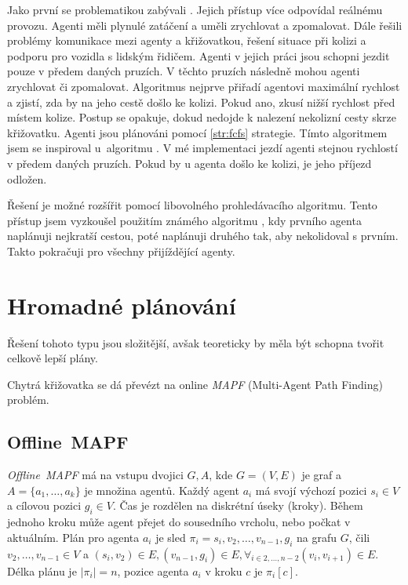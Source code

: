 Jako první se problematikou zabývali \citet*{Dresner}.
Jejich přístup více odpovídal reálnému provozu.
Agenti měli plynulé zatáčení a uměli zrychlovat a zpomalovat.
Dále \citet{Dresner} řešili problémy komunikace mezi agenty a křižovatkou, řešení situace při kolizi a podporu pro vozidla s lidským řidičem.
Agenti v jejich práci jsou schopni jezdit pouze v předem daných pruzích.
V těchto pruzích následně mohou agenti zrychlovat či zpomalovat.
Algoritmus nejprve přiřadí agentovi maximální rychlost a zjistí, zda by na jeho cestě došlo ke kolizi.
Pokud ano, zkusí nižší rychlost před místem kolize.
Postup se opakuje, dokud nedojde k nalezení nekolizní cesty skrze křižovatku.
Agenti jsou plánováni pomocí \ref{str:fcfs} strategie.
Tímto algoritmem jsem se inspiroval u~algoritmu .
V mé implementaci jezdí agenti stejnou rychlostí v předem daných pruzích.
Pokud by u agenta došlo ke kolizi, je jeho příjezd odložen.

Řešení je možné rozšířit pomocí libovolného prohledávacího algoritmu.
Tento přístup jsem vyzkoušel použitím známého algoritmu ,
kdy prvního agenta naplánuji nejkratší cestou, poté naplánuji druhého tak, aby nekolidoval s prvním.
Takto pokračuji pro všechny přijíždějící agenty.


\section{Hromadné plánování}\label{sec:hromadne_planovani}

Řešení tohoto typu jsou složitější, avšak teoreticky by měla být schopna tvořit celkově lepší plány.

Chytrá křižovatka se dá převézt na online \emph{MAPF} (Multi-Agent Path Finding) problém.

\subsection{Offline~MAPF}\label{subsec:offline_mapf}

\emph{Offline~MAPF} má na vstupu dvojici $G, A$, kde $G=(V, E)$ je graf a $A = \{a_1, \dots, a_k\}$ je množina agentů.
Každý agent $a_i$ má svojí výchozí pozici $s_i \in V$ a cílovou pozici $g_i \in V$.
Čas je rozdělen na diskrétní úseky (kroky).
Během jednoho kroku může agent přejet do sousedního vrcholu, nebo počkat v aktuálním.
Plán pro agenta $a_i$ je sled $\pi_i = s_i, v_2, \dots, v_{n-1}, g_i$ na grafu $G$, čili $v_2, \dots, v_{n-1} \in V$ a
$(s_i, v_2) \in E, (v_{n-1}, g_i) \in E, \forall_{i \in 2, \dots, n-2} (v_i, v_{i+1}) \in E$.
Délka plánu je $|\pi_i| = n$, pozice agenta $a_i$ v kroku $c$ je $\pi_i[c]$.

